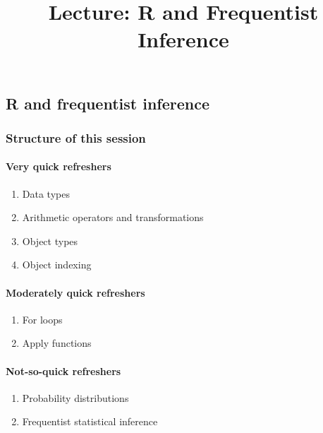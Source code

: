 \documentclass[
  11pt,
]{article}
\title{Lecture: R and Frequentist Inference}
\author{}
\date{\vspace{-2.5em}}
\providecommand{\tightlist}{%
  \setlength{\itemsep}{0pt}\setlength{\parskip}{0pt}}
\begin{document}
\maketitle

\hypertarget{r-and-frequentist-inference}{%
\subsection{R and frequentist inference}\label{r-and-frequentist-inference}}

\hypertarget{structure-of-this-session}{%
\subsubsection{Structure of this session}\label{structure-of-this-session}}

\hypertarget{very-quick-refreshers}{%
\paragraph{Very quick refreshers}\label{very-quick-refreshers}}

\begin{enumerate}
\def\labelenumi{\arabic{enumi}.}
\tightlist
\item
  Data types
\item
  Arithmetic operators and transformations
\item
  Object types
\item
  Object indexing
\end{enumerate}

\hypertarget{moderately-quick-refreshers}{%
\paragraph{Moderately quick refreshers}\label{moderately-quick-refreshers}}

\begin{enumerate}
\def\labelenumi{\arabic{enumi}.}
\tightlist
\item
  For loops
\item
  Apply functions
\end{enumerate}

\hypertarget{not-so-quick-refreshers}{%
\paragraph{Not-so-quick refreshers}\label{not-so-quick-refreshers}}

\begin{enumerate}
\def\labelenumi{\arabic{enumi}.}
\tightlist
\item
  Probability distributions
\item
  Frequentist statistical inference
\end{enumerate}
\end{document}
